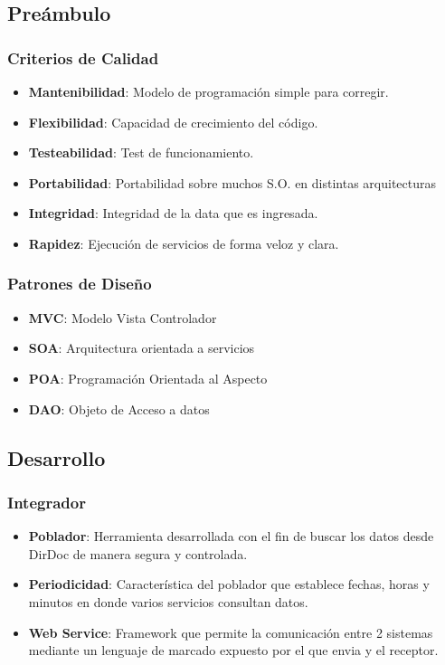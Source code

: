 \documentclass{beamer}
\begin{document}
\subsection{Preámbulo}


\begin{frame}
\frametitle{Criterios de Calidad}
\begin{itemize}
\item \textbf{Mantenibilidad}: Modelo de programación simple para corregir.
\item \textbf{Flexibilidad}: Capacidad de crecimiento del código.
\item \textbf{Testeabilidad}: Test de funcionamiento.
\item \textbf{Portabilidad}: Portabilidad sobre muchos S.O. en distintas arquitecturas
\item \textbf{Integridad}: Integridad de la data que es ingresada.
\item \textbf{Rapidez}: Ejecución de servicios de forma veloz y clara.
\end{itemize}
\end{frame}


\begin{frame}
\frametitle{Patrones de Diseño}
\begin{itemize}
\item \textbf{MVC}: Modelo Vista Controlador
\item \textbf{SOA}: Arquitectura orientada a servicios
\item \textbf{POA}: Programación Orientada al Aspecto
\item \textbf{DAO}: Objeto de Acceso a datos
\end{itemize}
\end{frame}

\subsection{Desarrollo}


\begin{frame}
\frametitle{Integrador}
\begin{itemize}
\item \textbf{Poblador}: Herramienta desarrollada con el fin de buscar los datos desde DirDoc de manera segura y controlada.
\item \textbf{Periodicidad}: Característica del poblador que establece fechas, horas y minutos en donde varios servicios consultan datos.
\item \textbf{Web Service}: Framework que permite la comunicación entre 2 sistemas mediante un lenguaje de marcado expuesto por el que envia y el receptor.
\end{itemize}
\end{frame}
\end{document}
